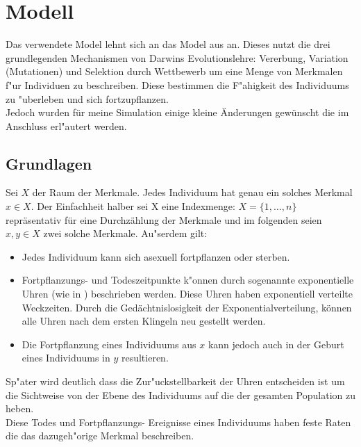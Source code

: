 \documentclass[11pt, a4paper, german]{article}
\begin{document}

\clearpage
\section{Modell}
Das verwendete Model lehnt sich an das Model aus \cite{Champagnat20061127} an. Dieses nutzt die drei grundlegenden Mechanismen von Darwins Evolutionslehre: Vererbung, Variation (Mutationen) und Selektion durch Wettbewerb um eine Menge von Merkmalen f"ur Individuen zu beschreiben. Diese bestimmen die F"ahigkeit des Individuums zu "uberleben und sich fortzupflanzen.\\
Jedoch wurden für meine Simulation einige kleine Änderungen gewünscht die im Anschluss erl"autert werden. \\
	\subsection{Grundlagen}
	Sei $ X $ der Raum der Merkmale. Jedes Individuum hat genau ein solches Merkmal $ x \in X $. Der Einfachheit halber sei X eine Indexmenge: $ X = \{1,\dots, n\} $ repräsentativ für eine Durchzählung der Merkmale und im folgenden seien $ x,y \in X $ zwei solche Merkmale. Au"serdem gilt:
	\begin{itemize}
		\item Jedes Individuum kann sich asexuell fortpflanzen oder sterben.
		\item Fortpflanzungs- und Todeszeitpunkte k"onnen durch sogenannte exponentielle Uhren (wie in \cite[S. 3]{fournier2004microscopic}) beschrieben werden. Diese Uhren haben exponentiell verteilte Weckzeiten. Durch die Gedächtnislosigkeit der Exponentialverteilung, können alle Uhren nach dem ersten Klingeln neu gestellt werden. 
		\item Die Fortpflanzung eines Individuums aus $ x $ kann jedoch auch in der Geburt eines Individuums in $ y $ resultieren.
	\end{itemize}
	Sp"ater wird deutlich dass die Zur"uckstellbarkeit der Uhren entscheiden ist um die Sichtweise von der Ebene des Individuums auf die der gesamten Population zu heben.\\
	Diese Todes und Fortpflanzungs- Ereignisse eines Individuums haben feste Raten die das dazugeh"orige Merkmal beschreiben.\\
	
\end{document}
